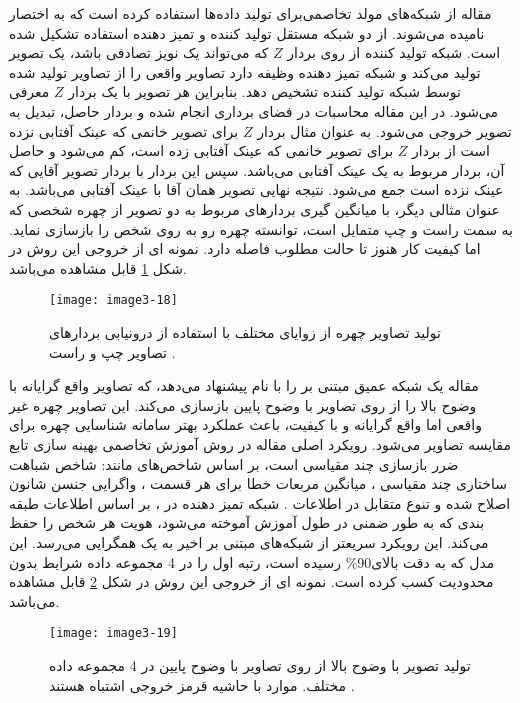 \noindent
مقاله \cite{radford2016unsupervised} از شبکه‌های مولد تخاصمی‌برای تولید داده‌ها استفاده کرده است که به اختصار  نامیده می‌شوند.  از دو شبکه مستقل تولید کننده و تمیز دهنده استفاده تشکیل شده است. شبکه تولید کننده از روی بردار $Z$ که می‌تواند یک نویز تصادفی باشد، یک تصویر تولید می‌کند و شبکه تمیز دهنده وظیفه دارد تصاویر واقعی را از تصاویر تولید شده توسط شبکه تولید کننده تشخیص دهد. بنابراین هر تصویر با یک بردار $Z$ معرفی می‌شود. در این مقاله محاسبات در فضای برداری انجام شده و بردار حاصل، تبدیل به تصویر خروجی می‌شود. به عنوان مثال بردار $Z$ برای تصویر خانمی که عینک آفتابی نزده است از بردار $Z$ برای تصویر خانمی که عینک آفتابی زده است، کم می‌شود و حاصل آن، بردار مربوط به یک عینک آفتابی می‌باشد. سپس این بردار با بردار تصویر آقایی که عینک نزده است جمع می‌شود. نتیجه نهایی تصویر همان آقا با عینک آفتابی می‌باشد. به عنوان مثالی دیگر، با میانگین گیری بردارهای مربوط به دو تصویر از چهره شخصی که به سمت راست و چپ متمایل است، توانسته چهره رو به روی شخص را بازسازی نماید. اما کیفیت کار هنوز تا حالت مطلوب فاصله دارد. نمونه ای از خروجی این روش در شکل \ref{image3-18} قابل مشاهده می‌باشد.

\begin{figure}[h]
\centering
  \texttt{[image: image3-18]}
  \caption{تولید تصاویر چهره از زوایای مختلف با استفاده از درونیابی بردارهای تصاویر چپ و راست \cite{radford2016unsupervised}.}
  \label{image3-18}
\end{figure}

\noindent
مقاله \cite{BANERJEE2018246} یک شبکه عمیق مبتنی بر  را با نام  پیشنهاد می‌دهد، که تصاویر واقع گرایانه با وضوح بالا را از روی تصاویر با وضوح پایین بازسازی می‌کند. این تصاویر چهره غیر واقعی اما واقع گرایانه و با کیفیت، باعث عملکرد بهتر سامانه شناسایی چهره برای مقایسه تصاویر می‌شود. رویکرد اصلی مقاله در روش آموزش تخاصمی  بهینه سازی تابع ضرر بازسازی چند مقیاسی  است، بر اساس شاخص‌های مانند: شاخص شباهت ساختاری چند مقیاسی ، میانگین مربعات خطا برای هر قسمت  ، واگرایی جنسن شانون اصلاح شده   و تنوع متقابل در اطلاعات .  شبکه تمیز دهنده در ، بر اساس اطلاعات طبقه‌ بندی که به طور ضمنی در طول آموزش آموخته می‌شود، هویت هر شخص را حفظ می‌کند. این رویکرد سریعتر از شبکه‌های مبتنی بر  اخیر به یک همگرایی می‌رسد. این مدل که به دقت بالای90\% رسیده است، رتبه اول را در 4 مجموعه داده شرایط بدون محدودیت کسب کرده است. نمونه ای از خروجی این روش در شکل \ref{image3-19} قابل مشاهده می‌باشد.

\begin{figure}[h]
\centering
  \texttt{[image: image3-19]}
  \caption{
تولید تصویر با وضوح بالا از روی تصاویر با وضوح پایین در 4 مجموعه داده مختلف. موارد با حاشیه قرمز خروجی اشتباه هستند
  \cite{BANERJEE2018246}.}
  \label{image3-19}
\end{figure}


